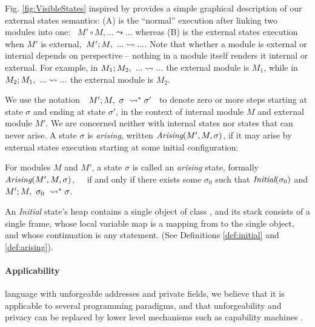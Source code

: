 Fig. \ref{fig:VisibleStates} inspired by  provides a simple graphical description of 
our external states semantics: (A) is the ``normal'' execution after 
linking two modules into one: \ $M' \circ M, ... \leadsto ...$ whereas (B) is the
 external states execution when $M'$ is external,\   $M' ; M,\ ... \leadsto ...$.
Note that whether a module is external or internal depends on %
perspective -- nothing in a module itself renders it internal or external. For example, in
 $M_1 ; M_2,\ ... \leadsto ...$ the external module is $M_1$,
  while in  $M_2 ; M_1,\ ... \leadsto ...$  the external module is $M_2$.

We  use the notation\ \  $M' ; M,\ \sigma\ \leadsto^* \sigma'$ \ 
to denote zero or more  steps starting at state $\sigma$ and ending at state $\sigma'$, in the context of internal module 
$M$ and external module $M'$.
We are concerned neither with internal states nor states that can never arise.
{A state $\sigma$ is \emph{arising},}  written $\textit{Arising}(M', M, \sigma)$, {if it  may arise by external states} execution
starting at some initial configuration:



\begin{definition}
\label{def:arising}
For   modules $M$ and  $M'$, a %
 state $\sigma$ is 
called an \emph{arising} state, formally \ \ \ $\textit{Arising}(M', M, \sigma)$,\ \ \ 
if and only if there exists some $\sigma_0$ such that $\textit{Initial}(\sigma_0)$ and
$M' ; M,\ \sigma_0\ \leadsto^* \sigma$.
\end{definition}

An \emph{Initial} state's heap
contains a single object of class , and
its  stack   consists of a single frame, whose local variable map is a
mapping from \prg{this} to the single object, and whose continuation is  any statement.
(See Definitions \ref{def:initial} and \ref{def:arising}).


\paragraph{Applicability} 
language with unforgeable addresses and private fields, we believe
 that %
 it is applicable to several programming paradigms, and 
 that   unforgeability and privacy
 can be replaced 
 by lower level mechanisms such as capability machines \cite{vanproving,davis2019cheriabi}.


